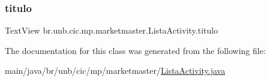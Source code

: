 \subsubsection{\texorpdfstring{titulo}{titulo}}
{\footnotesize\ttfamily Text\+View br.\+unb.\+cic.\+mp.\+marketmaster.\+Lista\+Activity.\+titulo\hspace{0.3cm}{\ttfamily [private]}}



The documentation for this class was generated from the following file\+:\begin{DoxyCompactItemize}
\item 
main/java/br/unb/cic/mp/marketmaster/\mbox{\hyperlink{ListaActivity_8java}{Lista\+Activity.\+java}}\end{DoxyCompactItemize}
